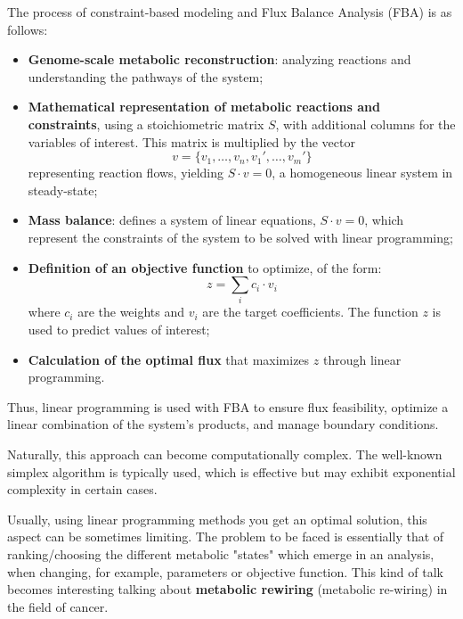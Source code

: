 The process of constraint-based modeling and Flux Balance Analysis (FBA) is as follows:
\begin{itemize}
    \item \textbf{Genome-scale metabolic reconstruction}: analyzing reactions and understanding the 
        pathways of the system;
    \item \textbf{Mathematical representation of metabolic reactions and constraints}, using a 
        stoichiometric matrix $S$, with additional columns for the variables of interest. This matrix is 
        multiplied by the vector 
        \begin{equation*}
            v = \{v_1, \dots, v_n, v_1', \dots, v_m'\}   
        \end{equation*}
        representing reaction flows, yielding $S \cdot v = 0$, a homogeneous linear system in 
        steady-state;
    \item \textbf{Mass balance}: defines a system of linear equations, $S \cdot v = 0$, which 
        represent the constraints of the system to be solved with linear programming;
    \item \textbf{Definition of an objective function} to optimize, of the form:
        \begin{equation}
            z = \sum_i c_i \cdot v_i
        \end{equation}
        where $c_i$ are the weights and $v_i$ are the target coefficients. The function $z$ is used 
        to predict values of interest;
    \item \textbf{Calculation of the optimal flux} that maximizes $z$ through linear programming.
\end{itemize}

Thus, linear programming is used with FBA to ensure flux feasibility, optimize a linear combination 
of the system’s products, and manage boundary conditions.

Naturally, this approach can become computationally complex. The well-known simplex algorithm is 
typically used, which is effective but may exhibit exponential complexity in certain cases.

Usually, using linear programming methods you get an optimal solution, this aspect can be
sometimes limiting. The problem to be faced is essentially that of ranking/choosing the 
different metabolic "states" which emerge in an analysis, when changing, for example, 
parameters or objective function. This kind of talk becomes interesting talking about 
\textbf{metabolic rewiring} (metabolic re-wiring) in the field of cancer.

